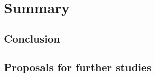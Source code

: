 \section{Summary}
\label{sec:summary}

\subsection{Conclusion}
\label{subsec:conclusion}

\subsection{Proposals for further studies}
\label{subsec:proposals-for-further-studies}
